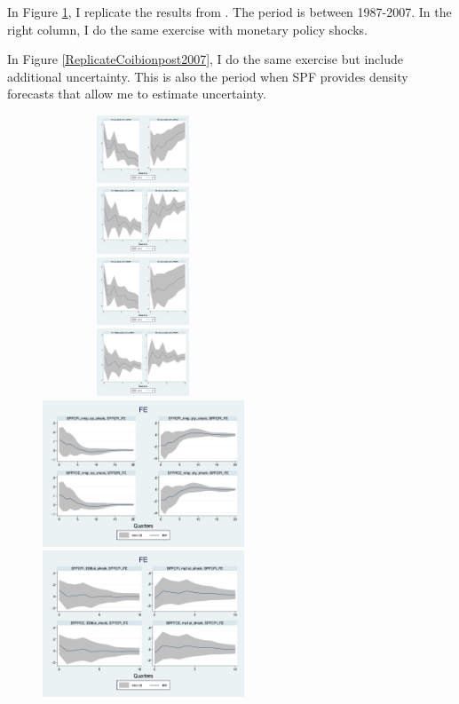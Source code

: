 \documentclass[]{article}
\begin{document}
In Figure \ref{ReplicateCoibionBefore2007}, I replicate the results from  \cite{coibion2012can}. The period is between 1987-2007.  In the right column, I do the same exercise with monetary policy shocks. 

In Figure \ref{ReplicateCoibionpost2007}, I do the same exercise but include additional uncertainty. This is also the period when SPF provides density forecasts that allow me to estimate uncertainty. 

\begin{figure}[h]\label{ReplicateCoibionBefore2007}
	\centering
	\includegraphics[width=6cm,height=2cm]{figures/CPIAU_ashocks_nmp.png}  
	\includegraphics[width=6cm,height=2cm]{figures/CPIAU_ashocks.png} \\
	\includegraphics[width=6cm,height=2cm]{figures/PCEPI_ashocks_nmp.png} 
	\includegraphics[width=6cm,height=2cm]{figures/PCEPI_ashocks.png}  \\
	\smallskip
	\includegraphics[width=6cm]{figures/SPFFE_ashocks_nmp.png} 
		\includegraphics[width=6cm]{figures/SPFFE_ashocks.png} \\

\end{figure}
\end{document}
